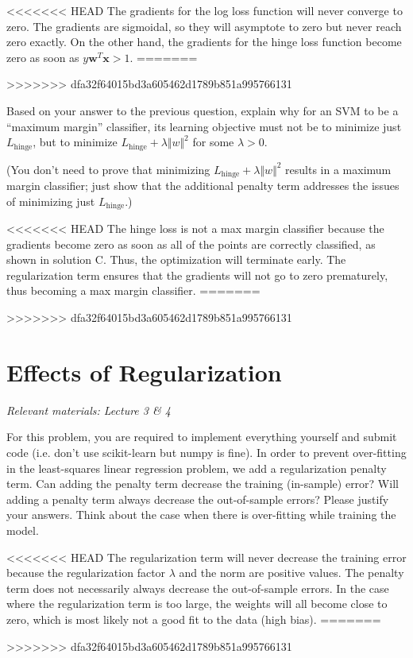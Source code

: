 \begin{solution}
<<<<<<< HEAD
  The gradients for the log loss function will never converge to zero. The gradients are sigmoidal, so they will asymptote to zero but never reach zero exactly. On the other hand, the gradients for the hinge loss function become zero as soon as $y\mathbf{w}^T\mathbf{x} > 1$.
=======

>>>>>>> dfa32f64015bd3a605462d1789b851a995766131
\end{solution}

\problem[5]
Based on your answer to the previous question, explain why for an SVM to be a ``maximum margin'' classifier, its learning objective must not be to minimize just $L_\text{hinge}$, but to minimize $L_\text{hinge} + \lambda\Vert w \Vert^2$ for some $\lambda > 0$.

(You don't need to prove that minimizing $L_\text{hinge} + \lambda\Vert w \Vert^2$ results in a maximum margin classifier; just show that the additional penalty term addresses the issues of minimizing just $L_\text{hinge}$.)

\begin{solution}
<<<<<<< HEAD
  The hinge loss is not a max margin classifier because the gradients become zero as soon as all of the points are correctly classified, as shown in solution C. Thus, the optimization will terminate early. The regularization term ensures that the gradients will not go to zero prematurely, thus becoming a max margin classifier. 
=======

>>>>>>> dfa32f64015bd3a605462d1789b851a995766131
\end{solution}

\newpage
\section{Effects of Regularization}
\textit{Relevant materials: Lecture 3 \& 4}

For this problem, you are required to implement everything yourself and submit code (i.e. don't use scikit-learn but numpy is fine).
\indent\problem[4] 
In order to prevent over-fitting in the least-squares linear regression problem, we add a regularization penalty term.
Can adding the penalty term decrease the training (in-sample) error?
Will adding a penalty term always decrease the out-of-sample errors?
Please justify your answers. Think about the case when there is over-fitting while training the model.

\begin{solution}
<<<<<<< HEAD
  The regularization term will never decrease the training error because the regularization factor $\lambda$ and the norm are positive values. The penalty term does not necessarily always decrease the out-of-sample errors. In the case where the regularization term is too large, the weights will all become close to zero, which is most likely not a good fit to the data (high bias).
=======
 
>>>>>>> dfa32f64015bd3a605462d1789b851a995766131
\end{solution}

